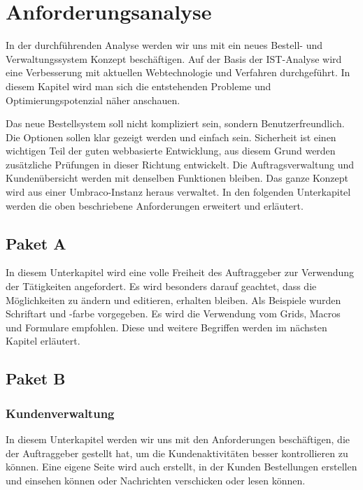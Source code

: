 \chapter{Anforderungsanalyse}

In der durchführenden Analyse werden wir uns mit ein neues Bestell- und Verwaltungssystem Konzept beschäftigen. Auf der Basis der IST-Analyse wird eine Verbesserung mit aktuellen Webtechnologie und Verfahren durchgeführt.
In diesem Kapitel wird man sich die entstehenden Probleme und Optimierungspotenzial näher anschauen.

Das neue Bestellsystem soll nicht kompliziert sein, sondern Benutzerfreundlich. Die Optionen sollen klar gezeigt werden und einfach sein. Sicherheit ist einen wichtigen Teil der guten webbasierte Entwicklung, aus diesem Grund werden zusätzliche Prüfungen in dieser Richtung entwickelt.
Die Auftragsverwaltung und Kundenübersicht werden mit denselben Funktionen bleiben.
Das ganze Konzept wird aus einer Umbraco-Instanz heraus verwaltet.
In den folgenden Unterkapitel werden die oben beschriebene Anforderungen erweitert und erläutert.


\section{Paket A}
In diesem Unterkapitel wird eine volle Freiheit des Auftraggeber zur Verwendung der Tätigkeiten angefordert. Es wird besonders darauf geachtet, dass die Möglichkeiten zu ändern und editieren, erhalten bleiben. Als Beispiele wurden Schriftart und -farbe vorgegeben.
Es wird die Verwendung vom Grids, Macros und Formulare empfohlen. 
Diese und weitere Begriffen werden im nächsten Kapitel erläutert.


\section{Paket B}


\subsection{Kundenverwaltung}

In diesem Unterkapitel werden wir uns mit den Anforderungen beschäftigen, die der Auftraggeber gestellt hat, um die Kundenaktivitäten besser kontrollieren zu können. Eine eigene Seite wird auch erstellt, in der Kunden Bestellungen erstellen und einsehen können oder Nachrichten verschicken oder lesen können.


